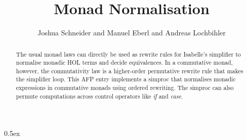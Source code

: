 \documentclass[11pt,a4paper]{article}
\begin{document}
\title{Monad Normalisation}
\author{Joshua Schneider and Manuel Eberl and Andreas Lochbihler}
\maketitle

\begin{abstract}
  The usual monad laws can directly be used as rewrite rules for Isabelle's simplifier to normalise
  monadic HOL terms and decide equivalences.  In a commutative monad, however, the commutativity
  law is a higher-order permutative rewrite rule that makes the simplifier loop.  This AFP entry
  implements a simproc that normalises monadic expressions in commutative monads using ordered
  rewriting.  The simproc can also permute computations across control operators like \textit{if}
  and \textit{case}.
\end{abstract}


\tableofcontents

\parindent 0pt\parskip 0.5ex





\end{document}
